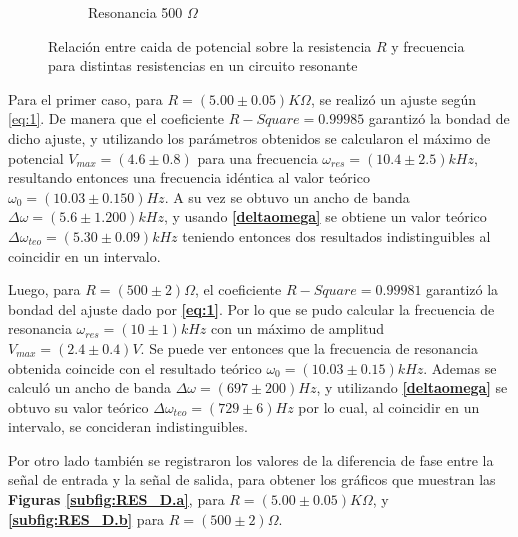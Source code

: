 \documentclass[11pt,a4paper]{article}
\begin{document}
\begin{figure}[h!]
\begin{subfigure}{0.5\textwidth}
  \caption{Resonancia 500 $\Omega$}
  \label{subfig:RES_I.b}
\end{subfigure}
  \caption{Relación entre caida de potencial sobre la resistencia $R$ y frecuencia para distintas resistencias en un circuito resonante}
  \label{fig:RES_I}
\end{figure}

Para el primer caso, para $R=(5.00 \pm 0.05)K\Omega$, se realizó un ajuste según \eqref{eq:1}. De manera que el coeficiente $R-Square = 0.99985$ garantizó la bondad de dicho ajuste, y utilizando los parámetros obtenidos se calcularon el máximo de potencial $V_{max}=(4.6 \pm 0.8)$ para una frecuencia $\omega_{res} = (10.4 \pm 2.5)kHz$, resultando entonces una frecuencia idéntica al valor teórico $\omega_0 = (10.03 \pm 0.150)Hz$. A su vez se obtuvo un ancho de banda $\Delta\omega = (5.6 \pm 1.200) kHz$, y usando \textbf{\eqref{deltaomega}} se obtiene un valor teórico $\Delta\omega_{teo} = (5.30 \pm 0.09)kHz$ teniendo entonces dos resultados indistinguibles al coincidir en un intervalo. 


Luego, para $R=(500 \pm 2)\Omega$, el coeficiente $R-Square = 0.99981$ garantizó la bondad del ajuste dado por \textbf{\eqref{eq:1}}. Por lo que se pudo calcular la frecuencia de resonancia $\omega_{res}= (10 \pm 1) kHz$ con un máximo de amplitud $V_{max}=(2.4 \pm 0.4) V$. Se puede ver entonces que la frecuencia de resonancia obtenida coincide con el resultado teórico $\omega_0 = (10.03 \pm 0.15) kHz$. Ademas se calculó un ancho de banda $\Delta\omega = (697 \pm 200)Hz$, y utilizando \textbf{\eqref{deltaomega}} se obtuvo su valor teórico $\Delta\omega_{teo} = (729 \pm 6) Hz$ por lo cual, al coincidir en un intervalo, se concideran indistinguibles.

Por otro lado también se registraron los valores de la diferencia de fase entre la señal de entrada y la señal de salida, para obtener los gráficos que muestran las \textbf{Figuras \ref{subfig:RES_D.a}}, para $R=(5.00 \pm 0.05) K\Omega$, y \textbf{\ref{subfig:RES_D.b}} para $R=(500 \pm 2)\Omega$.
\end{document}
